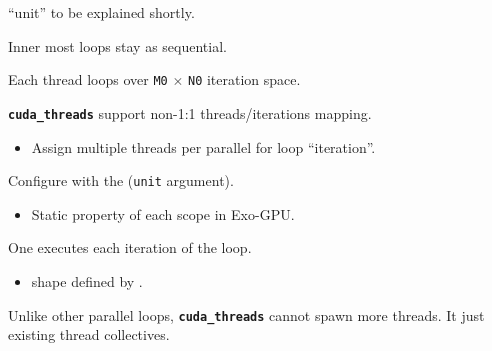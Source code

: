 \newpage
{}

{\large

}

{\LARGE
``unit'' to be explained shortly.

}

\newpage
{}

{\large

}

{\LARGE
Inner most loops stay as sequential.

Each thread loops over \texttt{M0} $\times$ \texttt{N0} iteration space.

}

\newpage
{}

{\large

}

{\LARGE
\texttt{\textbf{cuda\_threads}} support non-1:1 threads/iterations mapping.
\begin{itemize}
  \item Assign multiple threads per parallel for loop ``iteration''.
\end{itemize}

}

\newpage
{}

{\large

}

{\LARGE

Configure with the  (\texttt{unit} argument).
\begin{itemize}
  \item Static property of each scope in Exo-GPU.
\end{itemize}

One  executes each iteration of the loop.
\begin{itemize}
  \item shape defined by .
\end{itemize}

}

\newpage
{}

{\large

}

{\LARGE
Unlike other parallel loops, \texttt{\textbf{cuda\_threads}} cannot spawn more threads.
It just  existing thread collectives.
}

